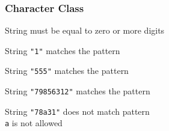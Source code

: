 \begin{frame}
  \frametitle{Character Class}
  \begin{center}
  \end{center}
  \begin{center}
    String must be equal to zero or more digits
  \end{center}
  \begin{overprint}
    \begin{center}
      String \texttt{"1"} matches the pattern \\[2mm]
    \end{center}

    \begin{center}
      String \texttt{"555"} matches the pattern \\[2mm]
    \end{center}

    \begin{center}
      String \texttt{"79856312"} matches the pattern \\[2mm]
    \end{center}

    \begin{center}
      String \texttt{"78a31"} does not match pattern \\[2mm]
      \texttt{a} is not allowed
    \end{center}
  \end{overprint}
\end{frame}

